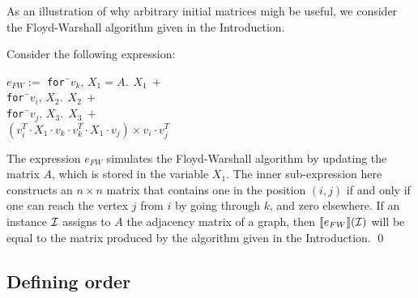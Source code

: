 As an illustration of why arbitrary initial matrices migh be useful, we consider the Floyd-Warshall algorithm given in the Introduction. 

\begin{example}\label{ex:floyd}
Consider the following expression:
\begin{center}
\parbox{0cm}{
\begin{tabbing}
$e_{FW} := $ \texttt{for\,}\=$v_k,\, X_1\!=\!A.\ \ X_1 \ + $\\
\> \texttt{for\,}\=$v_i, \, X_2.\ \ X_2 \ +$ \\
\>\>\texttt{for\,}\=$v_j,\, X_3.\ \ X_3 \ +$ \\
\>\>\>$(v_i^T\cdot X_1\cdot v_k \cdot v_k^T\cdot X_1\cdot v_j)\times v_i\cdot v_j^T$
\end{tabbing}
}
\end{center}
The expression $e_{FW}$ simulates the Floyd-Warshall algorithm by updating the matrix $A$, which is stored in the variable $X_1$. The inner sub-expression here constructs an $n\times n$ matrix that contains one in the position $(i,j)$ if and only if one can reach the vertex $j$ from $i$ by going through $k$, and zero elsewhere. If an instance $\mathcal{I}$ assigns to $A$ the adjacency matrix of a graph, then $\llbracket e_{FW} \rrbracket(\mathcal{I})$ will be equal to the matrix produced by the algorithm given in the Introduction.
\qed
\end{example}

\subsection{Defining order}
\label{sec:formatlang:design}


